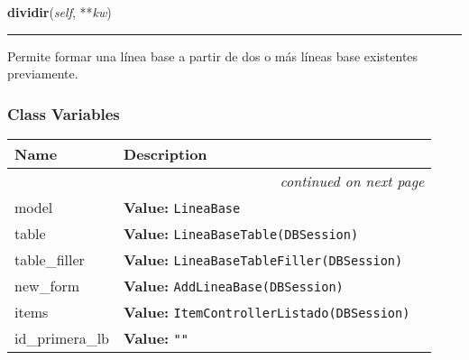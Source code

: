     \label{saip:controllers:linea_base_controller:LineaBaseController:dividir}

    \vspace{0.5ex}

\hspace{.8\funcindent}\begin{boxedminipage}{\funcwidth}

    \raggedright \textbf{dividir}(\textit{self}, **\textit{kw})

    \vspace{-1.5ex}

    \rule{\textwidth}{0.5\fboxrule}
\setlength{\parskip}{2ex}
    Permite formar una línea base a partir de dos o más líneas base 
    existentes previamente.

\setlength{\parskip}{1ex}
    \end{boxedminipage}



  \subsubsection{Class Variables}

    \vspace{-1cm}
\hspace{\varindent}\begin{longtable}{|p{\varnamewidth}|p{\vardescrwidth}|l}
\cline{1-2}
\cline{1-2} \centering \textbf{Name} & \centering \textbf{Description}& \\
\cline{1-2}
\endhead\cline{1-2}\multicolumn{3}{r}{\small\textit{continued on next page}}\\\endfoot\cline{1-2}
\endlastfoot\raggedright m\-o\-d\-e\-l\- & \raggedright \textbf{Value:} 
{\tt LineaBase}&\\
\cline{1-2}
\raggedright t\-a\-b\-l\-e\- & \raggedright \textbf{Value:} 
{\tt LineaBaseTable(DBSession)}&\\
\cline{1-2}
\raggedright t\-a\-b\-l\-e\-\_\-f\-i\-l\-l\-e\-r\- & \raggedright \textbf{Value:} 
{\tt LineaBaseTableFiller(DBSession)}&\\
\cline{1-2}
\raggedright n\-e\-w\-\_\-f\-o\-r\-m\- & \raggedright \textbf{Value:} 
{\tt AddLineaBase(DBSession)}&\\
\cline{1-2}
\raggedright i\-t\-e\-m\-s\- & \raggedright \textbf{Value:} 
{\tt ItemControllerListado(DBSession)}&\\
\cline{1-2}
\raggedright i\-d\-\_\-p\-r\-i\-m\-e\-r\-a\-\_\-l\-b\- & \raggedright \textbf{Value:} 
{\tt ""}&\\
\cline{1-2}
\end{longtable}

